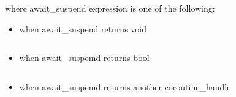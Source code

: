 \documentclass[twoside,twocolumn, 10pt]{article}
\begin{document}
	where await\_suspend expression is one of the following:

	\begin{itemize}
		\item when await\_suspend returns void \\ \inputminted[firstline=2, lastline=8]{c++}{code-examples/theory-custom-coroutine/co-await-transformation-suspend.cpp}
		\item when await\_suspemd returns bool \\ \inputminted[firstline=11, lastline=19]{c++}{code-examples/theory-custom-coroutine/co-await-transformation-suspend.cpp}
		\item when await\_suspemd returns another coroutine\_handle \\ \inputminted[firstline=22, lastline=31]{c++}{code-examples/theory-custom-coroutine/co-await-transformation-suspend.cpp}
	
	\end{itemize}
\end{document}
